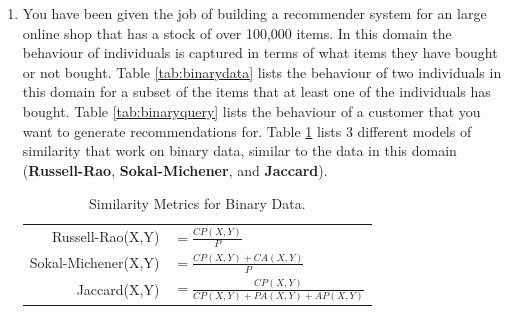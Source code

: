 \documentclass[solution]{ditpaper}
\begin{document}
			
\question 
\begin{enumerate}
	\item You have been given the job of building a recommender system for an large online shop that has a stock of over 100,000 items. In this domain the behaviour of individuals is captured in terms of what items they have bought or not bought. Table \ref{tab:binarydata} lists the behaviour of two individuals in this domain for a subset of the items that at least one of the individuals has bought. Table \ref{tab:binaryquery} lists the behaviour of a customer that you want to generate recommendations for. Table \ref{tab:similaritymetrics} lists 3 different models of similarity that work on binary data, similar to the data in this domain (\textbf{Russell-Rao}, \textbf{Sokal-Michener}, and \textbf{Jaccard}).
	\begin{table}[h]
	\begin{center}
	\begin{tabular}{rl}
	Russell-Rao(X,Y) & $= \frac{CP(X,Y)}{P}$\\
	Sokal-Michener(X,Y) & $=\frac{CP(X,Y)+CA(X,Y)}{P}$\\
	Jaccard(X,Y) & $=\frac{CP(X,Y)}{CP(X,Y)+PA(X,Y)+AP(X,Y)}$\\
	\end{tabular}
	\end{center}
	\caption{Similarity Metrics for Binary Data.}
	\label{tab:similaritymetrics}
	\end{table}


\end{enumerate}
\end{document}
